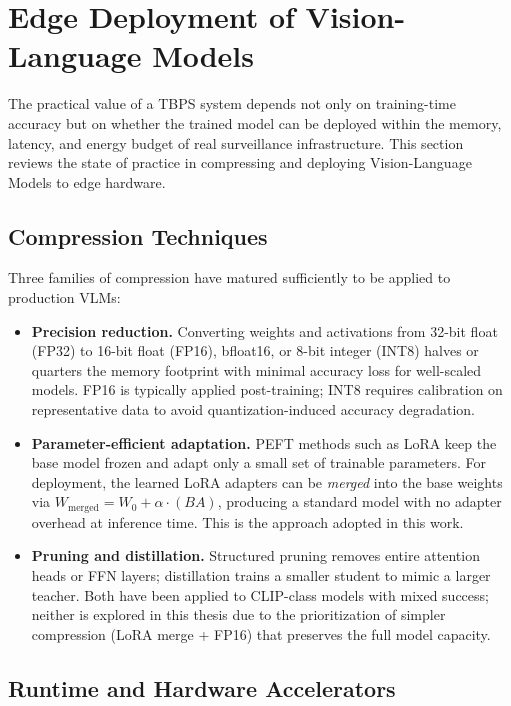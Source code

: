 \documentclass[../main.tex]{subfiles}
\begin{document}
\section{Edge Deployment of Vision-Language Models}
\label{sec:edge_deployment_lit}

\noindent The practical value of a TBPS system depends not only on training-time accuracy but on whether the trained model can be deployed within the memory, latency, and energy budget of real surveillance infrastructure. This section reviews the state of practice in compressing and deploying Vision-Language Models to edge hardware.

\subsection{Compression Techniques}

\noindent Three families of compression have matured sufficiently to be applied to production VLMs:

\begin{itemize}
    \item \textbf{Precision reduction.} Converting weights and activations from 32-bit float (FP32) to 16-bit float (FP16), bfloat16, or 8-bit integer (INT8) halves or quarters the memory footprint with minimal accuracy loss for well-scaled models. FP16 is typically applied post-training; INT8 requires calibration on representative data to avoid quantization-induced accuracy degradation.
    \item \textbf{Parameter-efficient adaptation.} PEFT methods such as LoRA keep the base model frozen and adapt only a small set of trainable parameters. For deployment, the learned LoRA adapters can be \textit{merged} into the base weights via $W_{\text{merged}} = W_0 + \alpha \cdot (BA)$, producing a standard model with no adapter overhead at inference time. This is the approach adopted in this work.
    \item \textbf{Pruning and distillation.} Structured pruning removes entire attention heads or FFN layers; distillation trains a smaller student to mimic a larger teacher. Both have been applied to CLIP-class models with mixed success; neither is explored in this thesis due to the prioritization of simpler compression (LoRA merge + FP16) that preserves the full model capacity.
\end{itemize}

\subsection{Runtime and Hardware Accelerators}
\end{document}
